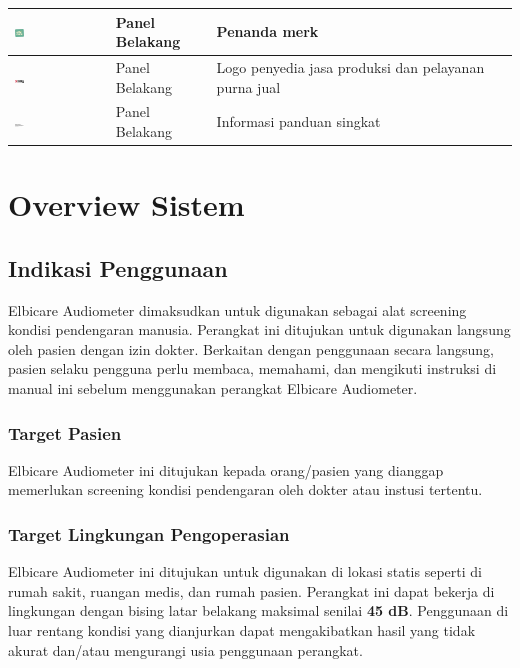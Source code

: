 \documentclass[11pt,a4paper,twoside,onecolumn]{book}
\begin{document}
\begin{table}
\begin{tabular}{| p{0.2\linewidth} | p{0.2\linewidth}| p{0.6\linewidth}|}
				\hline
				\includegraphics[width=0.1\textwidth]{images/penanda-merk} & Panel Belakang & Penanda merk\\
				\hline
				\includegraphics[width=0.1\textwidth]{images/xirka} & Panel Belakang & Logo penyedia jasa produksi dan pelayanan purna jual\\
				\hline
				\includegraphics[width=0.1\textwidth]{images/manual} & Panel Belakang & Informasi panduan singkat\\
				\hline
			\end{tabular}
		\end{table}
		
	\newpage
	
	\chapter{Overview Sistem}
		\section{Indikasi Penggunaan}
		Elbicare Audiometer dimaksudkan untuk digunakan sebagai alat screening kondisi pendengaran manusia. Perangkat ini ditujukan untuk digunakan langsung oleh pasien dengan izin dokter. Berkaitan dengan penggunaan secara langsung, pasien selaku pengguna perlu membaca, memahami, dan mengikuti instruksi di manual ini sebelum menggunakan perangkat Elbicare Audiometer.
			\subsection{Target Pasien}
			Elbicare Audiometer ini ditujukan kepada orang/pasien yang dianggap memerlukan screening kondisi pendengaran oleh dokter atau instusi tertentu.
			\subsection{Target Lingkungan Pengoperasian}
			Elbicare Audiometer ini ditujukan untuk digunakan di lokasi statis seperti di rumah sakit, ruangan medis, dan rumah pasien. Perangkat ini dapat bekerja di lingkungan dengan bising latar belakang maksimal senilai \textbf{45 dB}. Penggunaan di luar rentang kondisi yang dianjurkan dapat mengakibatkan hasil yang tidak akurat dan/atau mengurangi usia penggunaan perangkat.
			
\end{document}
